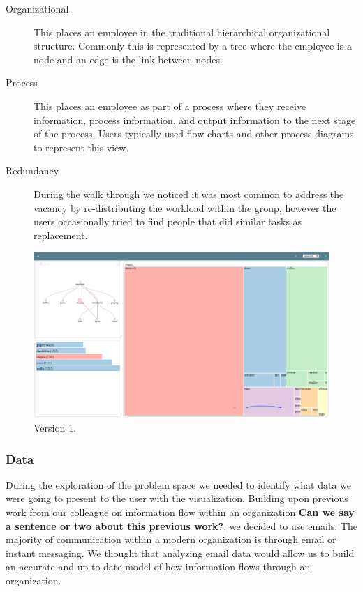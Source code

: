\documentclass[journal]{vgtc}                %
\begin{document}
\begin{description}
\item [Organizational] This places an employee in the traditional hierarchical organizational structure.  Commonly this is represented by a tree where the employee is a node and an edge is the link between nodes.
\item [Process] This places an employee as part of a process where they receive information, process information, and output information to the next stage of the process.  Users typically used flow charts and other process diagrams to represent this view.
\item [Redundancy] During the walk through we noticed it was most common to address the vacancy by re-distributing the workload within the group, however the users occasionally tried to find people that did similar tasks as replacement.
\end{description}
\begin{figure}
  \centering
  \includegraphics[width=\columnwidth]{pictures/version1.JPG}
  \caption{Version 1. }
  \label{fig:version1}
\end{figure}
      

\subsubsection{Data}
During the exploration of the problem space we needed to identify what data we were going to present to the user with the visualization.  Building upon previous work from our colleague on information flow within an organization \textbf{{\color{Plum}Can we say a sentence or two about this previous work?}}, we decided to use emails.  The majority of communication within a modern organization is through email or instant messaging.  We thought that analyzing email data would allow us to build an accurate and up to date model of how information flows through an organization.  
\end{document}
